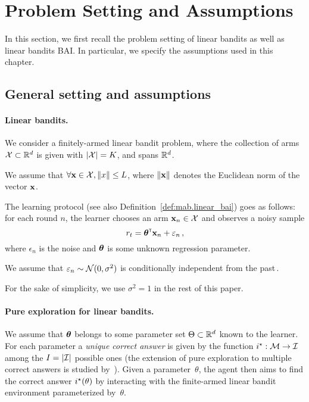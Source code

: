 \section{Problem Setting and Assumptions}\label{sec:lgc.formulation}

In this section, we first recall the problem setting of linear bandits as well as linear bandits BAI. In particular, we specify the assumptions used in this chapter.

\subsection{General setting and assumptions}\label{sec:lgc.formulation.general}

\paragraph{Linear bandits.}
We consider a finitely-armed linear bandit problem, where the collection of arms $\mathcal{X}\subset \mathbb{R}^d$ is given with $|\mathcal{X}|=K$, and spans $\mathbb{R}^d$. 
\begin{assumption}
\begin{leftbar}[assumptionbar]
    We assume that $\forall {\bf x}\in\mathcal{X}, \left\lVert x\right\rVert\leq L$, where $\left\lVert{\bf x}\right\rVert$ denotes the Euclidean norm of the vector ${\bf x}$.
\end{leftbar}
\end{assumption}

The learning protocol (see also Definition~\ref{def:mab.linear_bai}) goes as follows: for each round $n$, the learner chooses an arm ${\bf x}_n\in\mathcal{X}$ and observes a noisy sample
\[
    r_t = {\boldsymbol \theta}^\mathsf{\scriptscriptstyle T}{\bf x}_n +\varepsilon_n\,,
\]
where $\epsilon_n$ is the noise and ${\boldsymbol \theta}$ is some unknown regression parameter.
\begin{assumption}
\begin{leftbar}[assumptionbar]
    We assume that $\varepsilon_n \sim \mathcal{N}(0,\sigma^2)$ is conditionally independent from the past\,.
\end{leftbar}
\end{assumption}
For the sake of simplicity, we use $\sigma^2 = 1$ in the rest of this paper.

\paragraph{Pure exploration for linear bandits.}
We assume that ${\boldsymbol \theta}$ belongs to some parameter set $\Theta\subset\mathbb{R}^d$ known to the learner. For each parameter a \emph{unique correct answer} is given by the function $i^\star: \mathcal{M} \to \mathcal{I}$ among the $I = |\mathcal{I}|$ possible ones (the extension of pure exploration to multiple correct answers is studied by~\citealt{degenne2019pure}). Given a parameter~$\theta$, the agent then aims to find the correct answer $i^\star(\theta)$ by interacting with the finite-armed linear bandit environment parameterized by~$\theta$.


